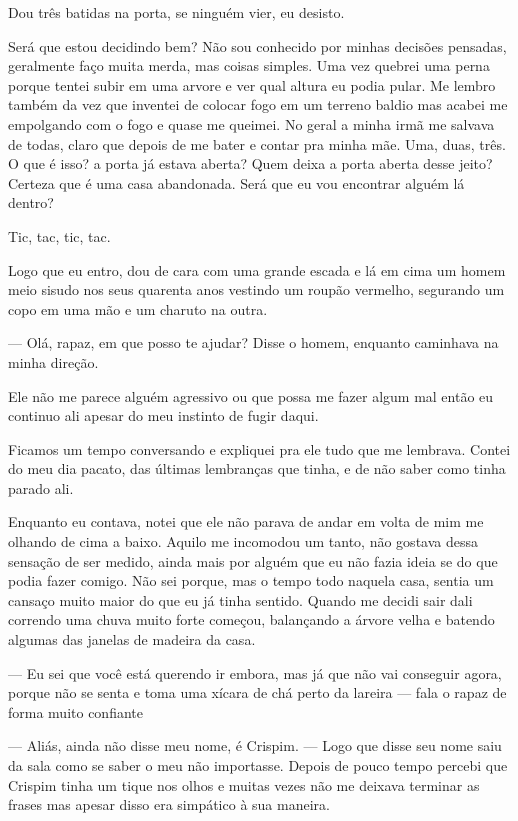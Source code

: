 Dou três batidas na porta, se ninguém vier, eu desisto.

Será que estou decidindo bem? Não sou conhecido por minhas decisões pensadas, geralmente faço muita merda, mas coisas simples. Uma vez quebrei uma perna porque tentei subir em uma arvore e ver qual altura eu podia pular. Me lembro também da vez que inventei de colocar fogo em um terreno baldio mas acabei me empolgando com o fogo e quase me queimei. No geral a minha irmã me salvava de todas, claro que depois de me bater e contar pra minha mãe.
Uma, duas, três. O que é isso? a porta já estava aberta? Quem deixa a porta aberta desse jeito? Certeza que é uma casa abandonada. Será que eu vou encontrar alguém lá dentro?

Tic, tac, tic, tac.

Logo que eu entro, dou de cara com uma grande escada e lá em cima um homem meio sisudo nos seus quarenta anos vestindo um roupão vermelho, segurando um copo em uma mão e um charuto na outra.

— Olá, rapaz, em que posso te ajudar? Disse o homem, enquanto caminhava na minha direção.

Ele não me parece alguém agressivo ou que possa me fazer algum mal então eu continuo ali apesar do meu instinto de fugir daqui.

Ficamos um tempo conversando e expliquei pra ele tudo que me lembrava. Contei do meu dia pacato, das últimas lembranças que tinha, e de não saber como tinha parado ali.

Enquanto eu contava, notei que ele não parava de andar em volta de mim me olhando de cima a baixo. Aquilo me incomodou um tanto, não gostava dessa sensação de ser medido, ainda mais por alguém que eu não fazia ideia se do que podia fazer comigo. Não sei porque, mas o tempo todo naquela casa, sentia um cansaço muito maior do que eu já tinha sentido. Quando me decidi sair dali correndo uma chuva muito forte começou, balançando a árvore velha e batendo algumas das janelas de madeira da casa.

— Eu sei que você está querendo ir embora, mas já que não vai conseguir agora, porque não se senta e toma uma xícara de chá perto da lareira — fala o rapaz de forma muito confiante 

— Aliás, ainda não disse meu nome, é Crispim. — Logo que disse seu nome saiu da sala como se saber o meu não importasse.
Depois de pouco tempo percebi que Crispim tinha um tique nos olhos e muitas vezes não me deixava terminar as frases mas apesar disso era simpático à sua maneira.

